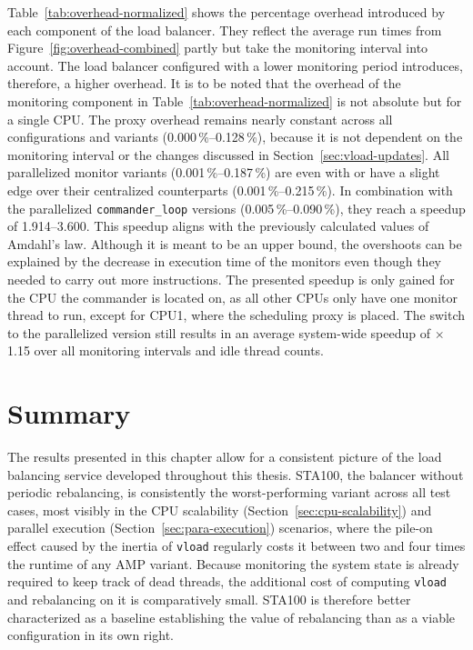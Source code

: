 Table~\ref{tab:overhead-normalized} shows the percentage overhead introduced by each component of the load balancer.
They reflect the average run times from Figure~\ref{fig:overhead-combined} partly but take the monitoring interval into account.
The load balancer configured with a lower monitoring period introduces, therefore, a higher overhead.
It is to be noted that the overhead of the monitoring component in Table~\ref{tab:overhead-normalized} is not absolute but for a single CPU.
The proxy overhead remains nearly constant across all configurations and variants (0.000\,\%--0.128\,\%), because it is not dependent on the monitoring interval or the changes discussed in Section~\ref{sec:vload-updates}.
All parallelized monitor variants (0.001\,\%--0.187\,\%) are even with or have a slight edge over their centralized counterparts (0.001\,\%--0.215\,\%).
In combination with the parallelized \texttt{commander\_loop} versions (0.005\,\%--0.090\,\%), they reach a speedup of 1.914--3.600.
This speedup aligns with the previously calculated values of Amdahl's law.
Although it is meant to be an upper bound, the overshoots can be explained by the decrease in execution time of the monitors even though they needed to carry out more instructions.
The presented speedup is only gained for the CPU the commander is located on, as all other CPUs only have one monitor thread to run, except for CPU1, where the scheduling proxy is placed.
The switch to the parallelized version still results in an average system-wide speedup of $\times$1.15 over all monitoring intervals and idle thread counts.

\section{Summary}

The results presented in this chapter allow for a consistent picture of the load balancing service developed throughout this thesis.
STA100, the balancer without periodic rebalancing, is consistently the worst-performing variant across all test cases, most visibly in the CPU scalability (Section~\ref{sec:cpu-scalability}) and parallel execution (Section~\ref{sec:para-execution}) scenarios, where the pile-on effect caused by the inertia of \texttt{vload} regularly costs it between two and four times the runtime of any AMP variant.
Because monitoring the system state is already required to keep track of dead threads, the additional cost of computing \texttt{vload} and rebalancing on it is comparatively small.
STA100 is therefore better characterized as a baseline establishing the value of rebalancing than as a viable configuration in its own right.

